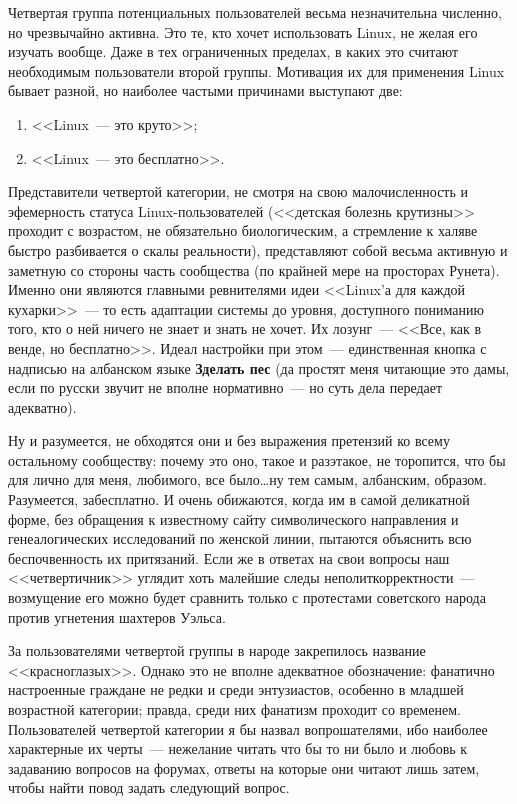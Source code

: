 Четвертая группа потенциальных пользователей весьма незначительна численно, но чрезвычайно активна. Это те, кто хочет использовать Linux, не желая его изучать вообще. Даже в тех ограниченных пределах, в каких это считают необходимым пользователи второй группы. Мотивация их для применения Linux бывает разной, но наиболее частыми причинами выступают две:
\begin{enumerate}
	\item <<Linux~--- это круто>>;
	\item <<Linux~--- это бесплатно>>.
\end{enumerate}
Представители четвертой категории, не смотря на свою малочисленность и эфемерность статуса Linux-пользователей (<<детская болезнь крутизны>> проходит с возрастом, не обязательно биологическим, а стремление к халяве быстро разбивается о скалы реальности), представляют собой весьма активную и заметную со стороны часть сообщества (по крайней мере на просторах Рунета). Именно они являются главными ревнителями идеи <<Linux'а для каждой кухарки>>~--- то есть адаптации системы до уровня, доступного пониманию того, кто о ней ничего не знает и знать не хочет. Их лозунг~--- <<Все, как в венде, но бесплатно>>. Идеал настройки при этом~--- единственная кнопка с надписью на албанском языке \textbf{Зделать пес}
 (да простят меня читающие это дамы, если по русски звучит не вполне нормативно~--- но суть дела передает адекватно).

Ну и разумеется, не обходятся они и без выражения претензий ко всему остальному сообществу: почему это оно, такое и разэтакое, не торопится, что бы для лично для меня, любимого, все было\dots ну тем самым, албанским, образом. Разумеется, забесплатно. И очень обижаются, когда им в самой деликатной форме, без обращения к известному сайту символического направления и генеалогических исследований по женской линии, пытаются объяснить всю беспочвенность их притязаний. Если же в ответах на свои вопросы наш <<четвертичник>> углядит хоть малейшие следы неполиткорректности~--- возмущение его можно будет сравнить только с протестами советского народа против угнетения шахтеров Уэльса.

За пользователями четвертой группы в народе закрепилось название <<красноглазых>>. Однако это не вполне адекватное обозначение: фанатично настроенные граждане не редки и среди энтузиастов, особенно в младшей возрастной категории; правда, среди них фанатизм проходит со временем. Пользователей четвертой категории я бы назвал вопрошателями, ибо наиболее характерные их черты~--- нежелание читать что бы то ни было и любовь к задаванию вопросов на форумах, ответы на которые они читают лишь затем, чтобы найти повод задать следующий вопрос.

